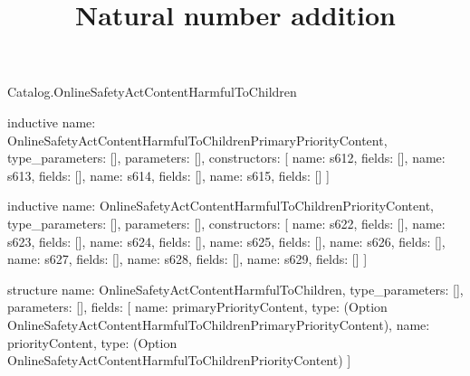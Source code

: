 \begin{lexlean}{Catalog.OnlineSafetyActContentHarmfulToChildren}
\title{Natural number addition}
\begin{semanticmodule}
inductive{
  name: OnlineSafetyActContentHarmfulToChildrenPrimaryPriorityContent,
  type_parameters: [],
  parameters: [],
  constructors: [
    {name: s612, fields: []},
    {name: s613, fields: []},
    {name: s614, fields: []},
    {name: s615, fields: []}
  ]
}

inductive{
  name: OnlineSafetyActContentHarmfulToChildrenPriorityContent,
  type_parameters: [],
  parameters: [],
  constructors: [
    {name: s622, fields: []},
    {name: s623, fields: []},
    {name: s624, fields: []},
    {name: s625, fields: []},
    {name: s626, fields: []},
    {name: s627, fields: []},
    {name: s628, fields: []},
    {name: s629, fields: []}
  ]
}

structure{
  name: OnlineSafetyActContentHarmfulToChildren,
  type_parameters: [],
  parameters: [],
  fields: [
    {name: primaryPriorityContent, type: (Option OnlineSafetyActContentHarmfulToChildrenPrimaryPriorityContent)},
    {name: priorityContent, type: (Option OnlineSafetyActContentHarmfulToChildrenPriorityContent)}
  ]
}
\end{semanticmodule}
\end{lexlean}
